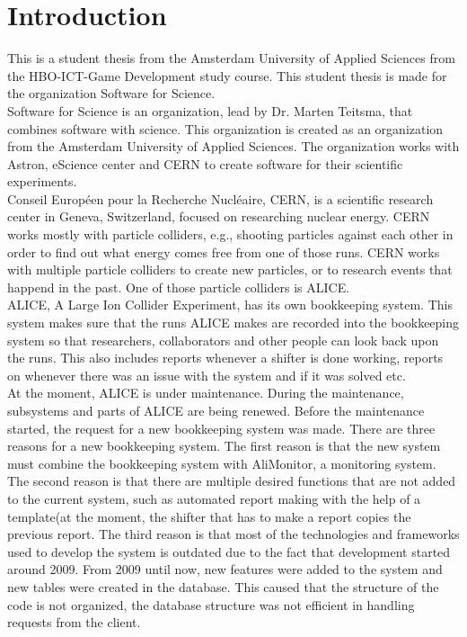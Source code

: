 \documentclass[paper=a4, fontsize=11pt,twoside]{scrartcl}	%
\begin{document}
\section{Introduction}
This is a student thesis from the Amsterdam University of Applied Sciences from the HBO-ICT-Game Development study course. This student thesis is made for the organization Software for Science. \\
Software for Science is an organization, lead by Dr. Marten Teitsma, that combines software with science. This organization is created as an organization from the Amsterdam University of Applied Sciences. The organization works with Astron, eScience center and CERN to create software for their scientific experiments. \\
Conseil Européen pour la Recherche Nucléaire, CERN, is a scientific research center in Geneva, Switzerland, focused on researching nuclear energy. CERN works mostly with particle colliders, e.g., shooting particles against each other in order to find out what energy comes free from one of those runs. CERN works with multiple particle colliders to create new particles, or to research events that happend in the past. One of those particle colliders is ALICE. \\
ALICE, A Large Ion Collider Experiment, has its own bookkeeping system. This system makes sure that the runs ALICE makes are recorded into the bookkeeping system so that researchers, collaborators and other people can look back upon the runs. This also includes reports whenever a shifter is done working, reports on whenever there was an issue with the system and if it was solved etc. \\
At the moment, ALICE is under maintenance. During the maintenance, subsystems and parts of ALICE are being renewed. Before the maintenance started, the request for a new bookkeeping system was made. There are three reasons for a new bookkeeping system. The first reason is that the new system must combine the bookkeeping system with AliMonitor, a monitoring system. The second reason is that there are multiple desired functions that are not added to the current system, such as automated report making with the help of a template(at the moment, the shifter that has to make a report copies the previous report. The third reason is that most of the technologies and frameworks used to develop the system is outdated due to the fact that development started around 2009. From 2009 until now, new features were added to the system and new tables were created in the database. This caused that the structure of the code is not organized, the database structure was not efficient in handling requests from the client. \\
\end{document}

